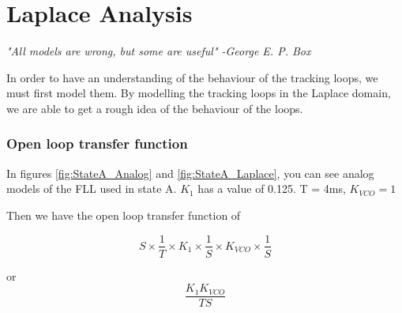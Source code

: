 \chapter{Laplace Analysis}

\emph{"All models are wrong, but some are useful" -George E. P. Box}


\begin{table}[!htb]
\caption{Test inputs for evaluating errors \cite{Nise}}
\label{tab:LaplaceTestInputs}
\end{table}






In order to have an understanding of the behaviour of the tracking loops, we must first model them. By modelling the tracking loops in the Laplace domain, we are able to get a rough idea of the behaviour of the loops. 

\subsection{Open loop transfer function}
In figures \ref{fig:StateA_Analog} and \ref{fig:StateA_Laplace}, you can see analog models of the FLL used in state A. $K_1$ has a value of 0.125. T = 4ms, $K_{VCO} = 1$

Then we have the open loop transfer function of 

\begin{equation}
S \times \frac{1}{T} \times K_1 \times \frac{1}{S} \times  
K_{VCO} \times \frac{1}{S}
\end{equation}

or 
\begin{equation}
\frac{K_1 K_{VCO}}{T S}
\end{equation}

